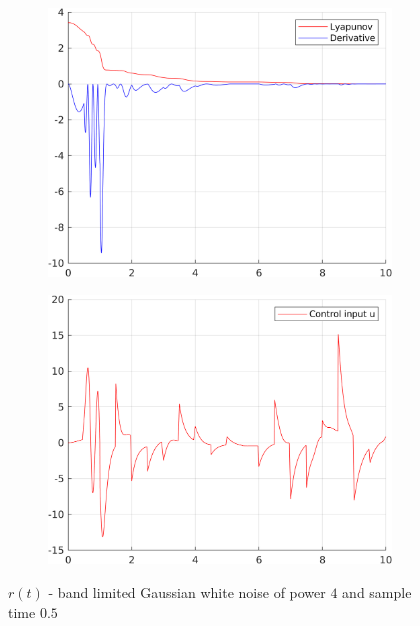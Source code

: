 \documentclass[12pt,a4paper]{article}
\begin{document}
\begin{figure}[H]
\begin{subfigure}{.45\textwidth}
				\includegraphics[width=1\textwidth]{Graphics/LinearLyapunov5.png}
			\end{subfigure}%
			\begin{subfigure}{.45\textwidth}
				\centering
				\includegraphics[width=1\textwidth]{Graphics/LinearControl5.png}
			\end{subfigure}
		\caption{$r(t)$ - band limited Gaussian white noise of power $4$ and sample time $0.5$}
		\label{fig:gaussian}
		\end{figure}
	
\end{document}
